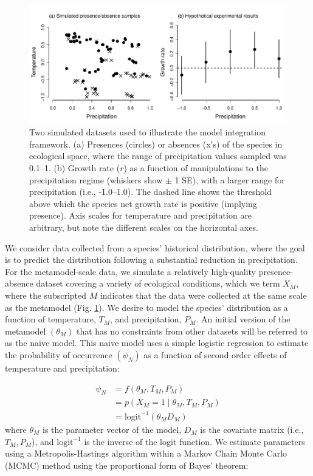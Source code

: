\documentclass[11pt]{article}
\newcommand{\rev}[1]{{\color{RoyalBlue}#1}}
\begin{document}
\begin{figure}[t]
	\includegraphics{figs/ex1_sampling.pdf}
	\caption{Two simulated datasets used to illustrate the model integration framework.
	(a) Presences (circles) or absences (x's) of the species in ecological space, \rev{where the range of precipitation values sampled was 0.1--1}.
	(b) Growth rate ($r$) as a function of manipulations to the precipitation regime (whiskers show $\pm$ 1 SE), with a larger range for precipitation (i.e., -1.0--1.0).
	The dashed line shows the threshold above which the species net growth rate is positive (implying presence).
	Axis scales for temperature and precipitation are arbitrary, but note the different scales on the horizontal axes.}
	\label{fig:ex1_sampling}
\end{figure}

We consider data collected from a species' historical distribution, where the goal is to predict the distribution following a substantial reduction in precipitation.
For the metamodel-scale data, we simulate a relatively high-quality presence-absence dataset covering a variety of ecological conditions, which we term \(X_M\), where the subscripted \(M\) indicates that the data were collected at the same scale as the metamodel (Fig. \ref{fig:ex1_sampling}).
We desire to model the species' distribution as a function of temperature, \(T_M\), and precipitation, \(P_M\).
An initial version of the metamodel \((\theta_M)\) that has no constraints from other datasets will be referred to as the naive model.
This naive model uses a simple logistic regression to estimate the probability of occurrence \((\psi_N)\) as a function of second order effects of temperature and precipitation:

\begin{equation}
\begin{aligned}
	\psi_N &= f\left(\theta_M, T_M, P_M \right) \\
	&= p \left (X_M = 1 \mid \theta_M, T_M, P_M \right) \\
	&=\text{logit}^{-1}\left( \theta_M D_M \right)
\end{aligned}
\end{equation}
where \(\theta_M\) is the parameter vector of the model, \(D_M\) is the covariate matrix (i.e., \(T_M, P_M\)), and \(\text{logit}^{-1}\) is the inverse of the logit function.
We estimate parameters using a Metropolis-Hastings algorithm within a Markov Chain Monte Carlo (MCMC) method using the proportional form of Bayes' theorem:
\end{document}
